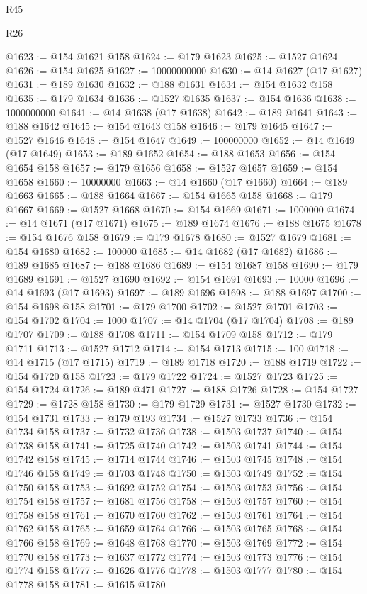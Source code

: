 \begin{lexlean}{R45}
\begin{lexlean}{R26}
\begin{coremodule}
{{{{{{{{{{{{{{{{{{{{{{{{{{{{{{{{{{{{{{{{{{{{{{{{{{{{{{{{{{{{{{{{{{{{{{{{@1623 := @154 @1621 @158
@1624 := @179 @1623
@1625 := @1527 @1624
@1626 := @154 @1625
@1627 := 10000000000
@1630 := @14 @1627 (@17 @1627)
@1631 := @189 @1630
@1632 := @188 @1631
@1634 := @154 @1632 @158
@1635 := @179 @1634
@1636 := @1527 @1635
@1637 := @154 @1636
@1638 := 1000000000
@1641 := @14 @1638 (@17 @1638)
@1642 := @189 @1641
@1643 := @188 @1642
@1645 := @154 @1643 @158
@1646 := @179 @1645
@1647 := @1527 @1646
@1648 := @154 @1647
@1649 := 100000000
@1652 := @14 @1649 (@17 @1649)
@1653 := @189 @1652
@1654 := @188 @1653
@1656 := @154 @1654 @158
@1657 := @179 @1656
@1658 := @1527 @1657
@1659 := @154 @1658
@1660 := 10000000
@1663 := @14 @1660 (@17 @1660)
@1664 := @189 @1663
@1665 := @188 @1664
@1667 := @154 @1665 @158
@1668 := @179 @1667
@1669 := @1527 @1668
@1670 := @154 @1669
@1671 := 1000000
@1674 := @14 @1671 (@17 @1671)
@1675 := @189 @1674
@1676 := @188 @1675
@1678 := @154 @1676 @158
@1679 := @179 @1678
@1680 := @1527 @1679
@1681 := @154 @1680
@1682 := 100000
@1685 := @14 @1682 (@17 @1682)
@1686 := @189 @1685
@1687 := @188 @1686
@1689 := @154 @1687 @158
@1690 := @179 @1689
@1691 := @1527 @1690
@1692 := @154 @1691
@1693 := 10000
@1696 := @14 @1693 (@17 @1693)
@1697 := @189 @1696
@1698 := @188 @1697
@1700 := @154 @1698 @158
@1701 := @179 @1700
@1702 := @1527 @1701
@1703 := @154 @1702
@1704 := 1000
@1707 := @14 @1704 (@17 @1704)
@1708 := @189 @1707
@1709 := @188 @1708
@1711 := @154 @1709 @158
@1712 := @179 @1711
@1713 := @1527 @1712
@1714 := @154 @1713
@1715 := 100
@1718 := @14 @1715 (@17 @1715)
@1719 := @189 @1718
@1720 := @188 @1719
@1722 := @154 @1720 @158
@1723 := @179 @1722
@1724 := @1527 @1723
@1725 := @154 @1724
@1726 := @189 @471
@1727 := @188 @1726
@1728 := @154 @1727
@1729 := @1728 @158
@1730 := @179 @1729
@1731 := @1527 @1730
@1732 := @154 @1731
@1733 := @179 @193
@1734 := @1527 @1733
@1736 := @154 @1734 @158
@1737 := @1732 @1736
@1738 := @1503 @1737
@1740 := @154 @1738 @158
@1741 := @1725 @1740
@1742 := @1503 @1741
@1744 := @154 @1742 @158
@1745 := @1714 @1744
@1746 := @1503 @1745
@1748 := @154 @1746 @158
@1749 := @1703 @1748
@1750 := @1503 @1749
@1752 := @154 @1750 @158
@1753 := @1692 @1752
@1754 := @1503 @1753
@1756 := @154 @1754 @158
@1757 := @1681 @1756
@1758 := @1503 @1757
@1760 := @154 @1758 @158
@1761 := @1670 @1760
@1762 := @1503 @1761
@1764 := @154 @1762 @158
@1765 := @1659 @1764
@1766 := @1503 @1765
@1768 := @154 @1766 @158
@1769 := @1648 @1768
@1770 := @1503 @1769
@1772 := @154 @1770 @158
@1773 := @1637 @1772
@1774 := @1503 @1773
@1776 := @154 @1774 @158
@1777 := @1626 @1776
@1778 := @1503 @1777
@1780 := @154 @1778 @158
@1781 := @1615 @1780
}}}}}}}}}}}}}}}}}}}}}}}}}}}}}}}}}}}}}}}}}}}}}}}}}}}}}}}}}}}}}}}}}}}}}}}}
\end{coremodule}
\end{lexlean}
\end{lexlean}
